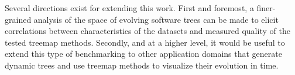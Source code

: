 Several directions exist for extending this work. First and foremost, a finer-grained analysis of the space of evolving software trees can be made to elicit correlations between characteristics of the datasets and measured quality of the tested treemap methods. Secondly, and at a higher level, it would be useful to extend this type of benchmarking to other application domains that generate dynamic trees and use treemap methods to visualize their evolution in time.

\newpage
